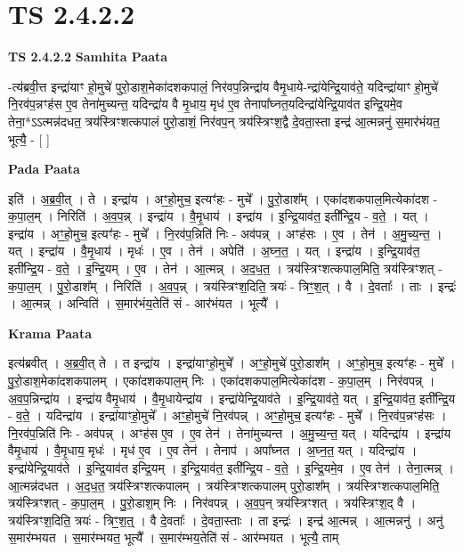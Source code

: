 \documentclass[17pt]{extarticle}
\begin{document}
\section*{ TS 2.4.2.2 }

\textbf{TS 2.4.2.2 } \newline
\textbf{Samhita Paata} \newline

-त्य॑ब्रवी॒त्त इन्द्रा॑याꣳ हो॒मुचे॑ पुरो॒डाश॒मेका॑दशकपालं॒ निर॑वप॒न्निन्द्रा॑य वैमृ॒धाये-न्द्रा॑येन्द्रि॒याव॑ते॒ यदिन्द्रा॑याꣳ हो॒मुचे॑ नि॒रव॑प॒न्नꣳह॑स ए॒व तेना॑मुच्यन्त॒ यदिन्द्रा॑य वै मृ॒धाय॒ मृध॑ ए॒व तेनापा᳚घ्नत॒यदिन्द्रा॑येन्द्रि॒याव॑त इन्द्रि॒यमे॒व तेना॒*ऽऽत्मन्न॑दधत॒ त्रय॑स्त्रिꣳशत्कपालं पुरो॒डाशं॒ निर॑वप॒न् त्रय॑स्त्रिꣳश॒द्वै दे॒वता॒स्ता इन्द्र॑ आ॒त्मन्ननु॑ स॒मार॑भंयत॒ भूत्यै॒ - [  ] \newline

\textbf{Pada Paata} \newline

इति॑ । अ॒ब्र॒वी॒त् । ते । इन्द्रा॑य । अꣳ॒॒हो॒मुच॒ इत्यꣳ॑हः - मुचे᳚ । पु॒रो॒डाश᳚म् । एका॑दशकपाल॒मित्येका॑दश - क॒पा॒ल॒म् । निरिति॑ । अ॒व॒प॒न्न् । इन्द्रा॑य । वै॒मृ॒धाय॑ । इन्द्रा॑य । इ॒न्द्रि॒याव॑त॒ इती᳚न्द्रि॒य - व॒ते॒ । यत् । इन्द्रा॑य । अꣳ॒॒हो॒मुच॒ इत्यꣳ॑हः - मुचे᳚ । नि॒रव॑प॒न्निति॑ निः - अव॑पन्न् । अꣳह॑सः । ए॒व । तेन॑ । अ॒मु॒च्य॒न्त॒ । यत् । इन्द्रा॑य । वै॒मृ॒धाय॑ । मृधः॑ । ए॒व । तेन॑ । अपेति॑ । अ॒घ्न॒त॒ । यत् । इन्द्रा॑य । इ॒न्द्रि॒याव॑त॒ इती᳚न्द्रि॒य - व॒ते॒ । इ॒न्द्रि॒यम् । ए॒व । तेन॑ । आ॒त्मन्न् । अ॒द॒ध॒त॒ । त्रय॑स्त्रिꣳशत्कपाल॒मिति॒ त्रय॑स्त्रिꣳशत् - क॒पा॒ल॒म् । पु॒रो॒डाश᳚म् । निरिति॑ । अ॒व॒प॒न्न् । त्रय॑स्त्रिꣳश॒दिति॒ त्रयः॑ - त्रिꣳ॒॒श॒त् । वै । दे॒वताः᳚ । ताः । इन्द्रः॑ । आ॒त्मन्न् । अन्विति॑ । स॒मार॑भंय॒तेति॑ सं - आर॑भंयत । भूत्यै᳚ ।  \newline


\textbf{Krama Paata} \newline

इत्य॑ब्रवीत् । अ॒ब्र॒वी॒त् ते । त इन्द्रा॑य । इन्द्रा॑याꣳहो॒मुचे᳚ । अꣳ॒॒हो॒मुचे॑ पुरो॒डाश᳚म् । अꣳ॒॒हो॒मुच॒ इत्यꣳ॑हः - मुचे᳚ । पु॒रो॒डाश॒मेका॑दशकपालम् । एका॑दशकपाल॒म् निः । एका॑दशकपाल॒मित्येका॑दश - क॒पा॒ल॒म् । निर॑वपन्न् । अ॒व॒प॒न्निन्द्रा॑य । इन्द्रा॑य वैमृ॒धाय॑ । वै॒मृ॒धायेन्द्रा॑य । इन्द्रा॑येन्द्रि॒याव॑ते । इ॒न्द्रि॒याव॑ते॒ यत् । इ॒न्द्रि॒याव॑त॒ इती᳚न्द्रि॒य - व॒ते॒ । यदिन्द्रा॑य । इन्द्रा॑याꣳहो॒मुचे᳚ । अꣳ॒॒हो॒मुचे॑ नि॒रव॑पन्न् । अꣳ॒॒हो॒मुच॒ इत्यꣳ॑हः - मुचे᳚ । नि॒रव॑प॒न्नꣳह॑सः । नि॒रव॑प॒न्निति॑ निः - अव॑पन्न् । अꣳह॑स ए॒व । ए॒व तेन॑ । तेना॑मुच्यन्त । अ॒मु॒च्य॒न्त॒ यत् । यदिन्द्रा॑य । इन्द्रा॑य वैमृ॒धाय॑ । वै॒मृ॒धाय॒ मृधः॑ । मृध॑ ए॒व । ए॒व तेन॑ । तेनाप॑ । अपा᳚घ्नत । अ॒घ्न॒त॒ यत् । यदिन्द्रा॑य । इन्द्रा॑येन्द्रि॒याव॑ते । इ॒न्द्रि॒याव॑त इन्द्रि॒यम् । इ॒न्द्रि॒याव॑त॒ इती᳚न्द्रि॒य - व॒ते॒ । इ॒न्द्रि॒यमे॒व । ए॒व तेन॑ । तेना॒त्मन्न् । आ॒त्मन्न॑दधत । अ॒द॒ध॒त॒ त्रय॑स्त्रिꣳशत्कपालम् । त्रय॑स्त्रिꣳशत्कपालम् पुरो॒डाश᳚म् । त्रय॑स्त्रिꣳशत्कपाल॒मिति॒ त्रय॑स्त्रिꣳशत् - क॒पा॒ल॒म् । पु॒रो॒डाश॒म् निः । निर॑वपन्न् । अ॒व॒प॒न् त्रय॑स्त्रिꣳशत् । त्रय॑स्त्रिꣳश॒द् वै । त्रय॑स्त्रिꣳश॒दिति॒ त्रयः॑ - त्रिꣳ॒॒श॒त्॒ । वै दे॒वताः᳚ । दे॒वता॒स्ताः । ता इन्द्रः॑ । इन्द्र॑ आ॒त्मन्न् । आ॒त्मन्ननु॑ । अनु॑ स॒मार॑म्भयत । स॒मार॑म्भयत॒ भूत्यै᳚ । स॒मार॑म्भय॒तेति॑ सं - आर॑म्भयत । भूत्यै॒ ताम् \newline
\end{document}
